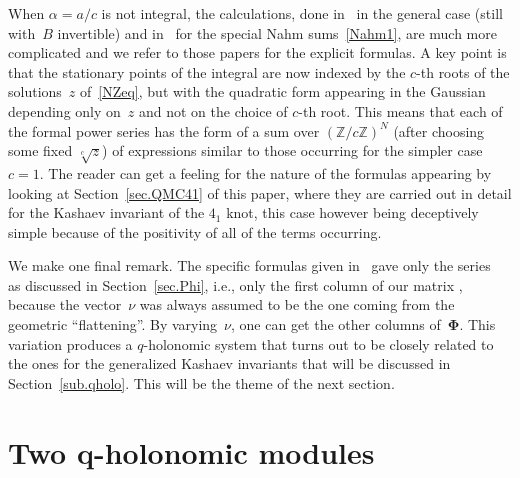 \documentclass[pdftex]{sigma}
\numberwithin{equation}{section}
\def\a{\alpha}
\def\Z{\mathbb Z}
\def\a{\alpha}
\def\s{\sigma}
\def\bPhi{\mathbf\Phi}
\begin{document}
When $\a=a/c$ is not integral, the calculations, done in~\cite{DG2} in the
general case (still with~$B$ invertible) and in~\cite{GZ:asymptotics} for the
special Nahm sums~\eqref{Nahm1}, are much more complicated and we refer to those
papers for the explicit formulas. A key point is that the stationary points of the
integral are now indexed by the $c$-th roots of the solutions~$z$ of~\eqref{NZeq},
but with the quadratic form appearing in the Gaussian depending only on~$z$ and
not on the choice of $c$-th root. This means that each of the formal power series
\smash{$\Phi_\a^{(\Xi,z)}(h)$} has the form of a sum over $(\Z/c\Z)^N$ \big(after choosing some
fixed $\sqrt[c]z$\big) of expressions similar to those occurring for the simpler
case~$c=1$. The reader can get a feeling for the nature of the formulas appearing
by looking at Section~\ref{sec.QMC41} of this paper, where they are carried out
in detail for the Kashaev invariant of the $4_1$ knot, this case however being
deceptively simple because of the positivity of all of the terms occurring.

We make one final remark. The specific formulas given in~\cite{DG,DG2}
gave only the series~\smash{$\Phi_\a^{(K,\s)}$} as discussed in Section~\ref{sec.Phi}, i.e., only
the first column of our matrix \smash{$\bPhi^{(K)}$}, because the vector~$\nu$ was always
assumed to be the one coming from the geometric ``flattening''. By varying~$\nu$,
one can get the other columns of~$\bPhi$. This variation produces a $q$-holonomic
system that turns out to be closely related to the ones for the generalized Kashaev
invariants that will be discussed in Section~\ref{sub.qholo}. This will be the theme of the next
section.

\section[Two q-holonomic modules]{Two $\boldsymbol{q}$-holonomic modules}\label{sec.NewHolonomy}
\end{document}
